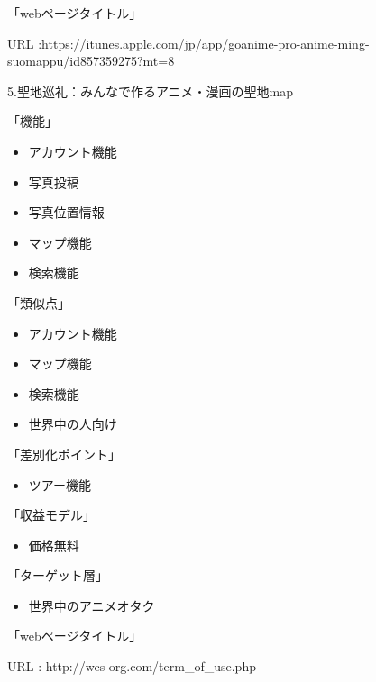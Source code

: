 「webページタイトル」
\par URL :https://itunes.apple.com/jp/app/goanime-pro-anime-ming-suomappu/id857359275?mt=8
\\
\par 5.聖地巡礼：みんなで作るアニメ・漫画の聖地map
\par 「機能」
\begin{itemize}
\item アカウント機能
\item 写真投稿
\item 写真位置情報
\item マップ機能
\item 検索機能
\end{itemize}
「類似点」
\begin{itemize}
\item アカウント機能
\item マップ機能
\item 検索機能
\item 世界中の人向け
\end{itemize}
「差別化ポイント」
\begin{itemize}
\item ツアー機能
\end{itemize}
「収益モデル」
\begin{itemize}
\item 価格無料
\end{itemize}
「ターゲット層」
\begin{itemize}
\item 世界中のアニメオタク
\end{itemize}
「webページタイトル」
\par URL : http://wcs-org.com/term\_of\_use.php

